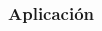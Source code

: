 \documentclass[14pt]{beamer}
\begin{document}
\begin{frame}
\frametitle{Aplicación}

\begin{columns}
\begin{column}{0.3\textwidth}
\begin{center}



\end{center}
\end{column}
\end{columns}
\end{frame}
\end{document}
